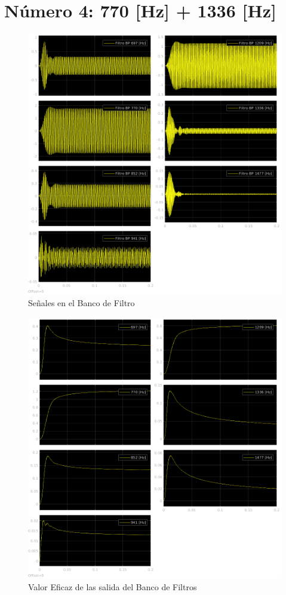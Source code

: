 \section{Número 4: 770 [Hz] + 1336 [Hz]}
\label{sec:signal_4}
\begin{figure}[H]
  \centering
  \includegraphics[width=\linewidth]{images/simulacion/fallas/bank/4.png}
  \caption{Señales en el Banco de Filtro}
  \label{fig:num_4_bank}
\end{figure}

\begin{figure}[H]
  \centering
  \includegraphics[width=\linewidth]{images/simulacion/fallas/rms/4.png}
  \caption{Valor Eficaz de las salida del Banco de Filtros }
  \label{fig:num_4_rms}
\end{figure}


